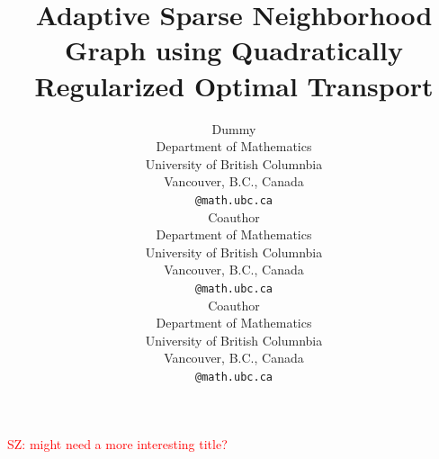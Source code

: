 \documentclass{article}
\newcommand{\red}[1]{\textcolor{red}{#1}}
\begin{document}
\title{ Adaptive Sparse Neighborhood Graph using Quadratically Regularized Optimal Transport }
\red{SZ: might need a more interesting title?}



\author{%
  Dummy \\
  Department of Mathematics\\
  University of British Columnbia\\
  Vancouver, B.C., Canada \\
  \texttt{@math.ubc.ca} \\
   \And
   Coauthor \\
   Department of Mathematics\\
  University of British Columnbia\\
  Vancouver, B.C., Canada \\
  \texttt{@math.ubc.ca} \\
   \AND
   Coauthor \\
  Department of Mathematics\\
  University of British Columnbia\\
  Vancouver, B.C., Canada \\
  \texttt{@math.ubc.ca} \\
}
\end{document}

